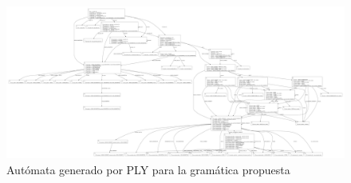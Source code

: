 \begin{figure}
    \centering
    \includegraphics[scale=0.13]{images/automata.pdf}
    \caption{Autómata generado por PLY para la gramática propuesta}
\end{figure}
